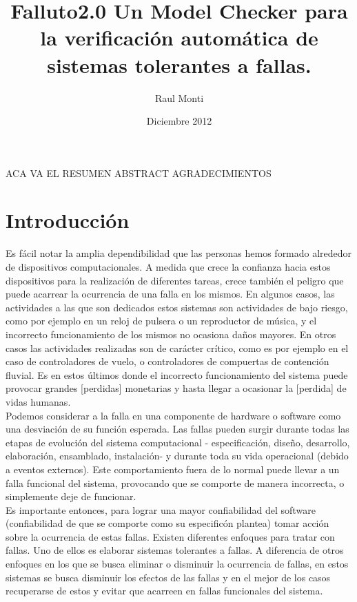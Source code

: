 \documentclass[titlepage, 12pt]{book}
\title{Falluto2.0 Un Model Checker para la verificaci\'on autom\'atica de sistemas tolerantes a fallas.}
\author{Raul Monti}
\date{Diciembre 2012}
\begin{document}
\maketitle

\newpage
ACA VA EL RESUMEN
\newpage
ABSTRACT
\newpage
AGRADECIMIENTOS

\newpage
\tableofcontents

\newpage



\chapter{Introducci\'on}
\label{introduccion}

Es f\'acil notar la amplia dependibilidad que las personas hemos formado alrededor de dispositivos computacionales. A medida que crece la confianza hacia estos dispositivos para la realizaci\'on de diferentes tareas, crece tambi\'en el peligro que puede acarrear la ocurrencia de una falla en los mismos. En algunos casos, las actividades a las que son dedicados estos sistemas son actividades de bajo riesgo, como por ejemplo en un reloj de pulsera o un reproductor de m\'usica, y el incorrecto funcionamiento de los mismos no ocasiona da\~nos mayores. En otros casos las actividades realizadas son de car\'acter cr\'itico, como es por ejemplo en el caso de controladores de vuelo, o controladores de compuertas de contenci\'on fluvial. Es en estos \'ultimos donde el incorrecto funcionamiento del sistema puede provocar grandes [perdidas] monetarias y hasta llegar a ocasionar la [perdida] de vidas humanas.\\

Podemos considerar a la falla en una componente de hardware o software como una desviaci\'on de su funci\'on esperada. Las fallas pueden surgir durante todas las etapas de evoluci\'on del sistema computacional - especificaci\'on, dise\~no, desarrollo, elaboraci\'on, ensamblado, instalaci\'on- y durante toda su vida operacional\cite{faultInjection} (debido a eventos externos). Este comportamiento fuera de lo normal puede llevar a un falla funcional del sistema, provocando que se comporte de manera incorrecta, o simplemente deje de funcionar.\\
Es importante entonces, para lograr una mayor confiabilidad del software (confiabilidad de que se comporte como su especific\'on plantea) tomar acci\'on sobre la ocurrencia de estas fallas. Existen diferentes enfoques para tratar con fallas. Uno de ellos es elaborar sistemas tolerantes a fallas. A diferencia de otros enfoques en los que se busca eliminar o disminuir la ocurrencia de fallas, en estos sistemas se busca disminuir los efectos de las fallas y en el mejor de los casos recuperarse de estos y evitar que acarreen en fallas funcionales del sistema.\\
\end{document}
